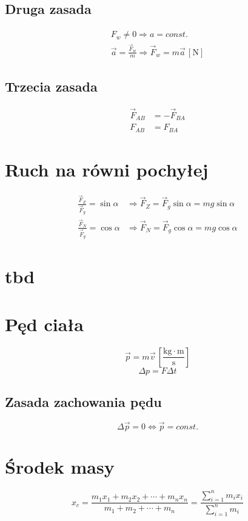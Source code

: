 \documentclass{report}
\numberwithin{equation}{chapter}
\newcommand{\unit}[1]{\,\left[\mathrm{#1}\right]}
\begin{document}
      \subsection{Druga zasada}
        \begin{gather}
          F_w \ne 0 \Rightarrow a = const.\\
          \vec a = \frac{\vec F_w}{m} \Rightarrow \vec F_w = m\vec a \unit{N}
        \end{gather}
      \subsection{Trzecia zasada}
        \begin{align}
          \vec F_{AB} &= -\vec F_{BA}\\
          F_{AB} &= F_{BA}
        \end{align}
    \section{Ruch na równi pochyłej}
      \begin{align}
        \frac{\vec F_Z}{\vec F_g} = \sin\alpha &\Rightarrow \vec F_Z = \vec F_g\sin\alpha = mg\sin\alpha\\
        \frac{\vec F_N}{\vec F_g} = \cos\alpha &\Rightarrow \vec F_N = \vec F_g\cos\alpha = mg\cos\alpha
      \end{align}
    \section{tbd}
    \section{Pęd ciała}
      \begin{equation}
        \vec p = m\vec v \unit{\frac{kg\cdot m}{s}}
      \end{equation}
      \begin{equation}
        \Delta p = F\Delta t
      \end{equation}
      \subsection{Zasada zachowania pędu}
        \begin{equation}
          \Delta \vec p = 0 \Leftrightarrow \vec p = const.
        \end{equation}
      \section{Środek masy}
        \begin{equation}
          x_c = \frac{m_1x_1+m_2x_2+\cdots+m_nx_n}{m_1+m_2+\cdots+m_n} =
          \frac{\sum\limits_{i=1}^n m_ix_i}{\sum\limits_{i=1}^n m_i}
        \end{equation}
\end{document}
